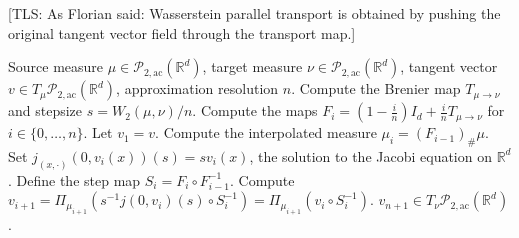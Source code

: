 \documentclass{article}
\newcommand{\tls}[1]{{\color{cyan}[TLS: #1]}}
\begin{document}
\tls{As Florian said: Wasserstein parallel transport is obtained by pushing the original tangent vector field through the transport map.}
\begin{algorithm}[H]
    \begin{algorithmic}[1]
        \caption{Parallel transport on $(\mathcal{P}_{2}(\mathbb{R}^d), W_2)$}
        \label{alg: W parallel transport}
        \Require Source measure $\mu \in \mathcal{P}_{2, \text{ac}}(\mathbb{R}^d)$, target measure $\nu \in \mathcal{P}_{2, \text{ac}}(\mathbb{R}^d)$, tangent vector $v \in T_{\mu}\mathcal{P}_{2, \text{ac}}(\mathbb{R}^d)$, approximation resolution $n$.  
        \State Compute the Brenier map $T_{\mu \rightarrow \nu}$ and stepsize $s = W_2(\mu, \nu)/n.$
        \State Compute the maps $F_i = (1 - \frac{i}{n})I_d + \frac{i}{n}T_{\mu \rightarrow \nu}$ for $i \in \{0, \dots, n\}$.
        \State Let $v_1 = v$.
            \State Compute the interpolated measure $\mu_i = (F_{i-1})_\#\mu$.
            \State Set $j_{(x, \cdot)}(0, v_i(x))(s) = sv_i(x)$, the solution to the Jacobi equation on $\mathbb{R}^d$.
            \State Define the step map $S_i = F_i \circ F_{i -1}^{-1}.$
            \State Compute $v_{i+1} = \Pi_{\mu_{i+1}}\left(s^{-1}j(0, v_i)(s) \circ S_i^{-1}\right) = \Pi_{\mu_{i + 1}}(v_i \circ S_i^{-1})$. 
        \EndFor
        \State \Return $v_{n+1} \in T_\nu \mathcal{P}_{2, \text{ac}}(\mathbb{R}^d)$. 
    \end{algorithmic}
\end{algorithm}
\end{document}
